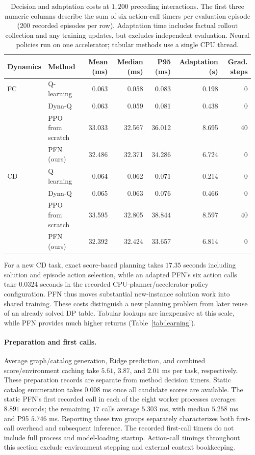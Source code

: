 \documentclass[a4paper,11pt]{article}
\numberwithin{equation}{section}
\begin{document}
\begin{table}[htbp]
\centering\small
\caption{Decision and adaptation costs at $1{,}200$ preceding interactions. The first three numeric columns describe the sum of six action-call timers per evaluation episode (200 recorded episodes per row). Adaptation time includes factual rollout collection and any training updates, but excludes independent evaluation. Neural policies run on one accelerator; tabular methods use a single CPU thread.}
\label{tab:deployment}
\setlength{\tabcolsep}{4pt}
\begin{tabular*}{\textwidth}{@{\extracolsep{\fill}}llrrrrr@{}}
\toprule Dynamics & Method & Mean (ms) & Median (ms) & P95 (ms) & Adaptation (s) & Grad. steps\\\midrule
FC & Q-learning & 0.063 & 0.058 & 0.083 & 0.198 & 0\\
& Dyna-Q & 0.063 & 0.059 & 0.081 & 0.438 & 0\\
& PPO from scratch & 33.033 & 32.567 & 36.012 & 8.695 & 40\\
& PFN (ours) & 32.486 & 32.371 & 34.286 & 6.724 & 0\\\midrule
CD & Q-learning & 0.064 & 0.062 & 0.071 & 0.214 & 0\\
& Dyna-Q & 0.065 & 0.063 & 0.076 & 0.466 & 0\\
& PPO from scratch & 33.595 & 32.805 & 38.844 & 8.597 & 40\\
& PFN (ours) & 32.392 & 32.424 & 33.657 & 6.814 & 0\\
\bottomrule
\end{tabular*}
\end{table}

For a new CD task, exact score-based planning takes $17.35$ seconds including solution and episode action selection, while an adapted PFN's six action calls take $0.0324$ seconds in the recorded CPU-planner/accelerator-policy configuration. PFN thus moves substantial new-instance solution work into shared training. These costs distinguish a new planning problem from later reuse of an already solved DP table. Tabular lookups are inexpensive at this scale, while PFN provides much higher returns (Table~\ref{tab:learning}).

\paragraph{Preparation and first calls.}
Average graph/catalog generation, Ridge prediction, and combined score/environment caching take $5.61$, $3.87$, and $2.01$ ms per task, respectively. These preparation records are separate from method decision timers. Static catalog enumeration takes $0.008$ ms once all candidate scores are available. The static PFN's first recorded call in each of the eight worker processes averages $8.891$ seconds; the remaining $17$ calls average $5.303$ ms, with median $5.258$ ms and P95 $5.746$ ms. Reporting these two groups separately characterizes both first-call overhead and subsequent inference. The recorded first-call timers do not include full process and model-loading startup. Action-call timings throughout this section exclude environment stepping and external context bookkeeping.
\end{document}
